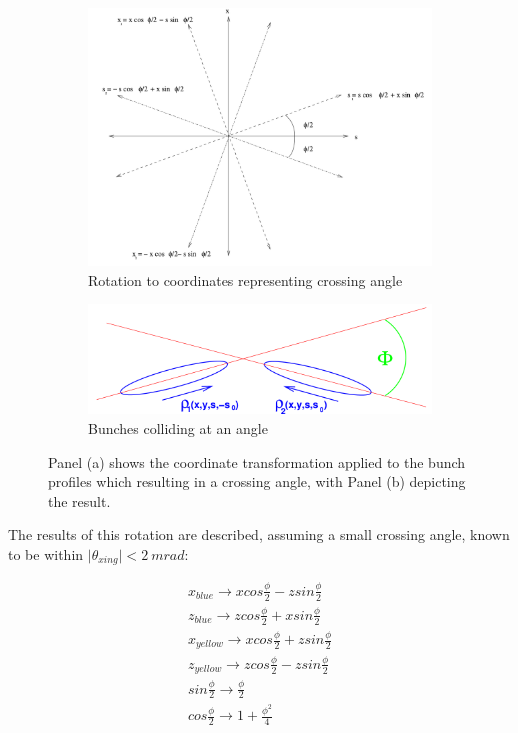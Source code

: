 \begin{figure}[ht]
  \centering
  \begin{subfigure}[b]{\textwidth}
    \centering
    \includegraphics[width=\linewidth]{./figures/bunch_rotation.png}
    \caption{Rotation to coordinates representing crossing angle~\cite{Herr2003a}}
  \end{subfigure}
  \begin{subfigure}[b]{\textwidth}
    \centering
    \includegraphics[width=\linewidth]{./figures/xing_bunch.png}
    \caption{Bunches colliding at an angle~\cite{Herr2003a}}
  \end{subfigure}
  \caption{
    Panel (a) shows the coordinate transformation applied to the bunch profiles
    which resulting in a crossing angle, with Panel (b) depicting the result.
  }
  \label{fig:bunch_transform}
\end{figure}
\clearpage
The results of this rotation are described, assuming a small crossing angle,
known to be within $\vert\theta_{xing}\vert < 2~mrad$:

\begin{gather}
\label{eq:transformations}
x_{blue}   \rightarrow x cos \frac{\phi}{2} - z sin \frac{\phi}{2} \\
z_{blue}   \rightarrow z cos \frac{\phi}{2} + x sin \frac{\phi}{2} \\
x_{yellow} \rightarrow x cos \frac{\phi}{2} + z sin \frac{\phi}{2} \\
z_{yellow} \rightarrow z cos \frac{\phi}{2} - z sin \frac{\phi}{2} \\
sin \frac {\phi}{2} \rightarrow \frac{\phi}{2} \\
cos \frac {\phi}{2} \rightarrow 1 + \frac{\phi^2}{4}
\end{gather}

